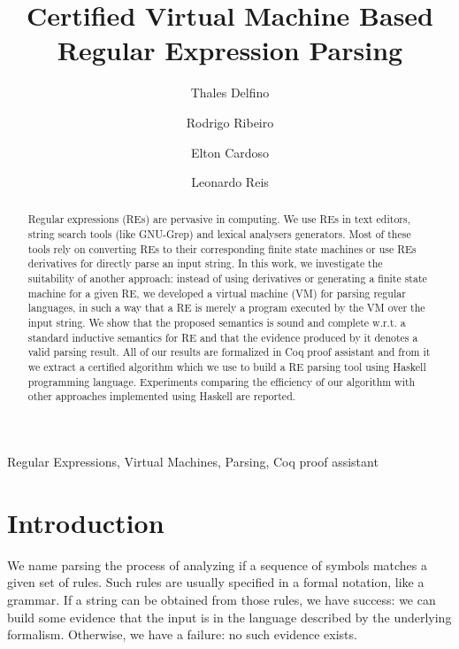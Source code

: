 \documentclass[review]{elsarticle}
\theoremstyle{definition}
\begin{document}
\begin{frontmatter}

\title{Certified Virtual Machine Based Regular Expression Parsing}

\author{Thales Delfino}
\author{Rodrigo Ribeiro}
\address{Departamento de Computa\c{c}\~ao - DECOM, Universidade Federal de Ouro Preto}
\author{Elton Cardoso}
\address{Departamento de Computa\c{c}\~ao e Sistemas - DECSI, Universidade Federal de Ouro Preto}
\author{Leonardo Reis}
\address{Departamento de Computa\c{c}\~ao, Universidade Federal de Juiz de Fora}


\begin{abstract}
Regular expressions (REs) are pervasive in computing. We use REs in text editors, string search tools
(like GNU-Grep) and lexical analysers generators. Most of these tools rely on
converting REs to their corresponding finite state machines or use REs derivatives for directly parse an
input string. In this work, we investigate the suitability of another approach: instead of
using derivatives or generating a finite state machine for a given RE, we developed a virtual machine
(VM) for parsing regular languages, in such a way that a RE is merely a program executed by the VM
over the input string. We show that the proposed semantics is sound and complete w.r.t. a standard
inductive semantics for RE and that the evidence produced by it denotes a valid parsing result.
All of our results are formalized in Coq proof assistant and from it we extract a certified algorithm
which we use to build a RE parsing tool using Haskell programming language. Experiments comparing the
efficiency of our algorithm with other approaches implemented using Haskell are reported.
\end{abstract}

\begin{keyword}
Regular Expressions, Virtual Machines, Parsing, Coq proof assistant
\end{keyword}

\end{frontmatter}

\linenumbers

%

\section{Introduction}\label{sec:intro}

We name parsing the process of analyzing if a sequence of symbols matches a given set of rules.
Such rules are usually specified in a formal notation, like a grammar. If a string can be obtained
from those rules, we have success: we can build some evidence that the input is in the language
described by the underlying formalism. Otherwise, we have a failure: no such evidence exists.
\end{document}
